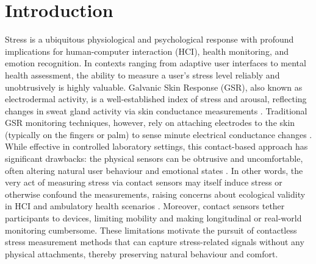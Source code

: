 \documentclass[11pt,a4paper]{report}
\begin{document}
\tableofcontents

\chapter{Introduction}

Stress is a ubiquitous physiological and psychological response with profound implications for human-computer interaction (HCI), health monitoring, and emotion recognition. In contexts ranging from adaptive user interfaces to mental health assessment, the ability to measure a user's stress level reliably and unobtrusively is highly valuable. Galvanic Skin Response (GSR), also known as electrodermal activity, is a well-established index of stress and arousal, reflecting changes in sweat gland activity via skin conductance measurements \cite{Boucsein2012}. Traditional GSR monitoring techniques, however, rely on attaching electrodes to the skin (typically on the fingers or palm) to sense minute electrical conductance changes \cite{Fowles1981}. While effective in controlled laboratory settings, this contact-based approach has significant drawbacks: the physical sensors can be obtrusive and uncomfortable, often altering natural user behaviour and emotional states \cite{Cacioppo2007}. In other words, the very act of measuring stress via contact sensors may itself induce stress or otherwise confound the measurements, raising concerns about ecological validity in HCI and ambulatory health scenarios \cite{Wilhelm2010}. Moreover, contact sensors tether participants to devices, limiting mobility and making longitudinal or real-world monitoring cumbersome. These limitations motivate the pursuit of contactless stress measurement methods that can capture stress-related signals without any physical attachments, thereby preserving natural behaviour and comfort.
\end{document}
